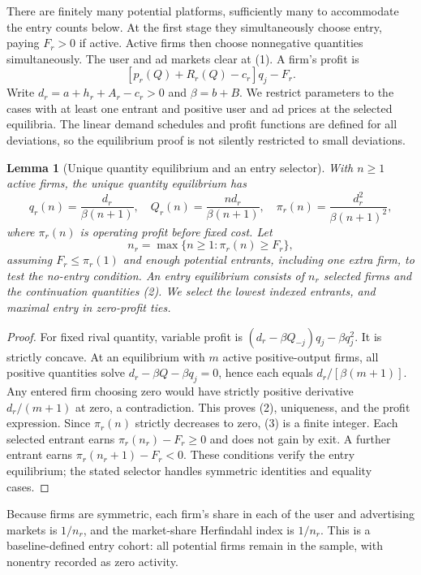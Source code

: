 \documentclass[11pt]{article}
\newtheorem{lemma}[theorem]{Lemma}
\theoremstyle{remark}
\begin{document}
There are finitely many potential platforms, sufficiently many to accommodate the entry counts below. At the first stage they simultaneously choose entry, paying $F_r>0$ if active. Active firms then choose nonnegative quantities simultaneously. The user and ad markets clear at (1). A firm's profit is
\[
 [p_r(Q)+R_r(Q)-c_r]q_j-F_r.
\]
Write $d_r=a+h_r+A_r-c_r>0$ and $\beta=b+B$. We restrict parameters to the cases with at least one entrant and positive user and ad prices at the selected equilibria. The linear demand schedules and profit functions are defined for all deviations, so the equilibrium proof is not silently restricted to small deviations.

\begin{lemma}[Unique quantity equilibrium and an entry selector]
With $n\geq1$ active firms, the unique quantity equilibrium has
\[
 q_r(n)=\frac{d_r}{\beta(n+1)},\quad
 Q_r(n)=\frac{nd_r}{\beta(n+1)},\quad
 \pi_r(n)=\frac{d_r^2}{\beta(n+1)^2},                     \tag{2}
\]
where $\pi_r(n)$ is operating profit before fixed cost. Let
\[
 n_r=\max\{n\geq1:\pi_r(n)\geq F_r\},                  \tag{3}
\]
assuming $F_r\leq\pi_r(1)$ and enough potential entrants, including one extra firm, to test the no-entry condition. An entry equilibrium consists of $n_r$ selected firms and the continuation quantities (2). We select the lowest indexed entrants, and maximal entry in zero-profit ties.
\end{lemma}
\begin{proof}
For fixed rival quantity, variable profit is
$(d_r-\beta Q_{-j})q_j-\beta q_j^2$. It is strictly concave. At an equilibrium with $m$ active positive-output firms, all positive quantities solve $d_r-\beta Q-\beta q_j=0$, hence each equals $d_r/[\beta(m+1)]$. Any entered firm choosing zero would have strictly positive derivative $d_r/(m+1)$ at zero, a contradiction. This proves (2), uniqueness, and the profit expression. Since $\pi_r(n)$ strictly decreases to zero, (3) is a finite integer. Each selected entrant earns $\pi_r(n_r)-F_r\geq0$ and does not gain by exit. A further entrant earns $\pi_r(n_r+1)-F_r<0$. These conditions verify the entry equilibrium; the stated selector handles symmetric identities and equality cases.
\end{proof}

Because firms are symmetric, each firm's share in each of the user and advertising markets is $1/n_r$, and the market-share Herfindahl index is $1/n_r$. This is a baseline-defined entry cohort: all potential firms remain in the sample, with nonentry recorded as zero activity.
\end{document}

